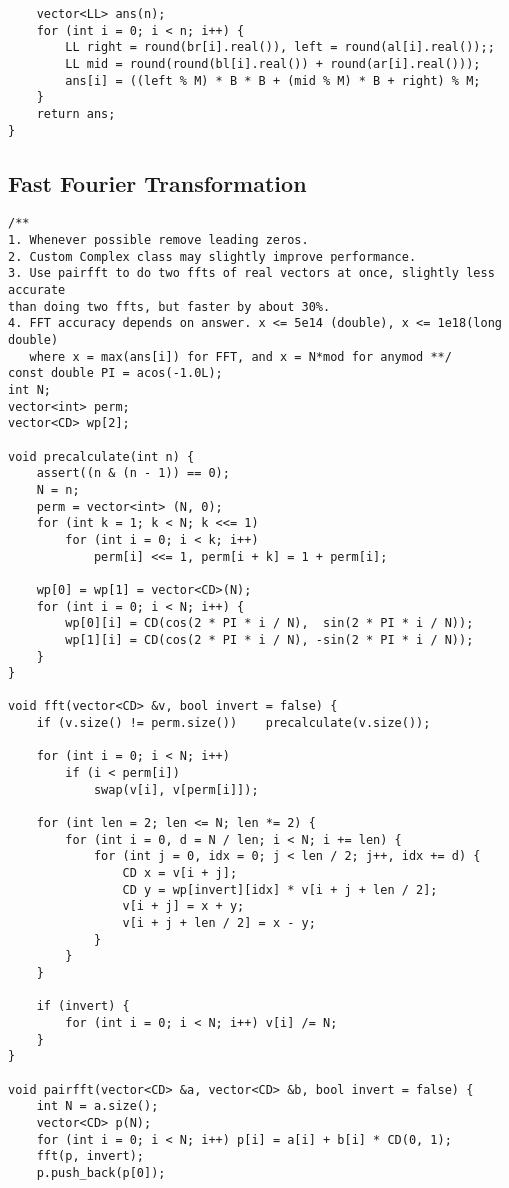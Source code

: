 \documentclass[10pt,a4paper,onesided]{article}
\begin{document}
\begin{multicols*}{3}
\begin{lstlisting}
    vector<LL> ans(n);
    for (int i = 0; i < n; i++) {
        LL right = round(br[i].real()), left = round(al[i].real());;
        LL mid = round(round(bl[i].real()) + round(ar[i].real()));
        ans[i] = ((left % M) * B * B + (mid % M) * B + right) % M;
    }
    return ans;
}
\end{lstlisting}
\subsection{Fast Fourier Transformation}
\begin{lstlisting}
/**
1. Whenever possible remove leading zeros.
2. Custom Complex class may slightly improve performance.
3. Use pairfft to do two ffts of real vectors at once, slightly less accurate
than doing two ffts, but faster by about 30%.
4. FFT accuracy depends on answer. x <= 5e14 (double), x <= 1e18(long double)
   where x = max(ans[i]) for FFT, and x = N*mod for anymod **/
const double PI = acos(-1.0L);
int N;
vector<int> perm;
vector<CD> wp[2];

void precalculate(int n) {
    assert((n & (n - 1)) == 0);
    N = n;
    perm = vector<int> (N, 0);
    for (int k = 1; k < N; k <<= 1)
        for (int i = 0; i < k; i++)
            perm[i] <<= 1, perm[i + k] = 1 + perm[i];

    wp[0] = wp[1] = vector<CD>(N);
    for (int i = 0; i < N; i++) {
        wp[0][i] = CD(cos(2 * PI * i / N),  sin(2 * PI * i / N));
        wp[1][i] = CD(cos(2 * PI * i / N), -sin(2 * PI * i / N));
    }
}

void fft(vector<CD> &v, bool invert = false) {
    if (v.size() != perm.size())    precalculate(v.size());

    for (int i = 0; i < N; i++)
        if (i < perm[i])
            swap(v[i], v[perm[i]]);

    for (int len = 2; len <= N; len *= 2) {
        for (int i = 0, d = N / len; i < N; i += len) {
            for (int j = 0, idx = 0; j < len / 2; j++, idx += d) {
                CD x = v[i + j];
                CD y = wp[invert][idx] * v[i + j + len / 2];
                v[i + j] = x + y;
                v[i + j + len / 2] = x - y;
            }
        }
    }

    if (invert) {
        for (int i = 0; i < N; i++) v[i] /= N;
    }
}

void pairfft(vector<CD> &a, vector<CD> &b, bool invert = false) {
    int N = a.size();
    vector<CD> p(N);
    for (int i = 0; i < N; i++) p[i] = a[i] + b[i] * CD(0, 1);
    fft(p, invert);
    p.push_back(p[0]);


\end{lstlisting}
\end{multicols*}
\end{document}
